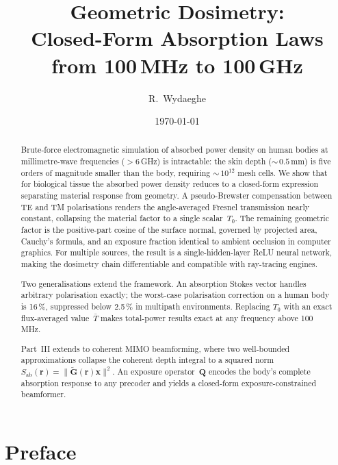 \documentclass[11pt,a4paper]{article}
\title{\textbf{Geometric Dosimetry:\\
Closed-Form Absorption Laws from 100\,MHz to 100\,GHz}}
\author{R.\ Wydaeghe}
\date{\today}
\theoremstyle{definition}
\newcommand{\Sab}{S_{\mathrm{ab}}}
\newcommand{\Tbar}{\bar{T}}
\begin{document}
\maketitle

\begin{abstract}
Brute-force electromagnetic simulation of absorbed power density on
human bodies at millimetre-wave frequencies ($>6$\,GHz) is intractable:
the skin depth (${\sim}\,0.5$\,mm) is five orders of magnitude smaller
than the body, requiring ${\sim}\,10^{12}$ mesh cells.
We show that for biological tissue the absorbed power density reduces
to a closed-form expression separating material response from geometry.
A pseudo-Brewster compensation between TE and TM polarisations
renders the angle-averaged Fresnel transmission nearly constant,
collapsing the material factor to a single scalar~$T_0$.  The remaining
geometric factor is the positive-part cosine of the surface normal, governed
by projected area, Cauchy's formula, and an exposure fraction identical
to ambient occlusion in computer graphics.  For multiple sources, the result
is a single-hidden-layer ReLU neural network, making the dosimetry chain
differentiable and compatible with ray-tracing engines.

Two generalisations extend the framework.  An absorption Stokes vector
handles arbitrary polarisation exactly; the worst-case polarisation
correction on a human body is 16\,\%, suppressed below 2.5\,\% in
multipath environments.  Replacing $T_0$ with an exact flux-averaged
value~$\Tbar$ makes total-power results exact at any frequency above
100\,MHz.

Part~III extends to coherent MIMO beamforming, where two well-bounded
approximations collapse the coherent depth integral to a squared norm
$\Sab(\mathbf{r})=\|\tilde{\mathbf{G}}(\mathbf{r})\mathbf{x}\|^2$.  An
exposure operator~$\mathbf{Q}$ encodes the body's complete absorption
response to any precoder and yields a closed-form exposure-constrained
beamformer.
\end{abstract}

\tableofcontents
\newpage

\section*{Preface}
\end{document}
